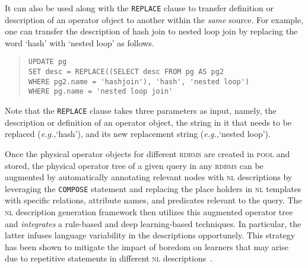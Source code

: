 \documentclass[11pt]{article}
\newcommand{\eg}{\emph{e.g.,}\xspace}
\begin{document}
It can also be used along with the \texttt{REPLACE} clause to transfer definition or description of an operator object to another within the \emph{same} source. For example, one can transfer the description of hash join to nested loop join by replacing the word \textsf{`hash'} with \textsf{`nested loop'} as follows.

\begin{quote}
\begin{verbatim}
UPDATE pg
SET desc = REPLACE((SELECT desc FROM pg AS pg2
WHERE pg2.name = 'hashjoin'), 'hash', 'nested loop')
WHERE pg.name = 'nested loop join'
\end{verbatim}
\end{quote}

Note that the \texttt{REPLACE} clause takes three parameters as input, namely, the description or definition of an operator object, the string in it that needs to be replaced (\eg \textsf{`hash'}), and its new replacement string (\eg \textsf{`nested loop'}).

Once the physical operator objects for different \textsc{rdbms} are created in \textsc{pool} and stored, the physical operator tree of a given query in any \textsc{rdbms} can be augmented by automatically annotating relevant nodes with \textsc{nl} descriptions by leveraging the \texttt{COMPOSE} statement and replacing the place holders in \textsc{nl} templates with specific relations, attribute names, and predicates relevant to the query.  The \textsc{nl} description generation framework then utilizes this augmented operator tree and \textit{integrates} a rule-based and deep learning-based techniques. In particular, the latter infuses language variability in the descriptions opportunely. This strategy has been shown to mitigate the impact of boredom on learners that may arise due to repetitive statements in different \textsc{nl} descriptions~\cite{lantern}.
\end{document}
